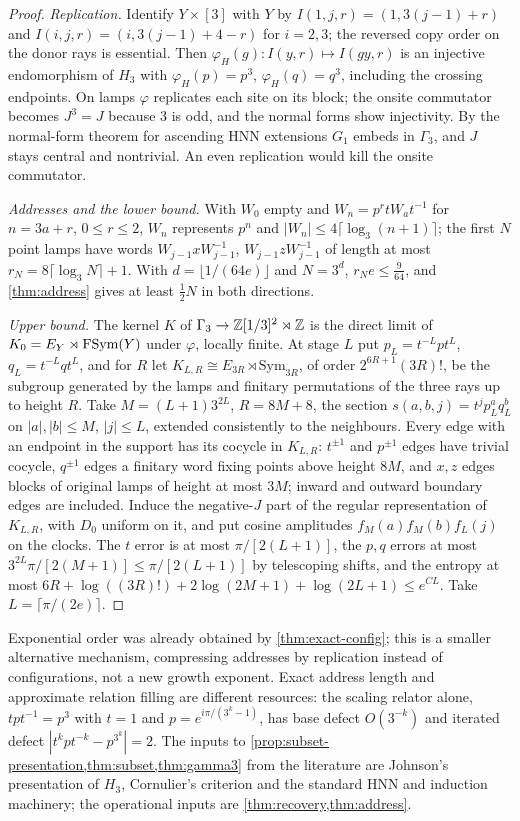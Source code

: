 \begin{proof}
\emph{Replication.} Identify $Y\times[3]$ with $Y$ by $I(1,j,r)=(1,3(j-1)+r)$ and $I(i,j,r)=(i,3(j-1)+4-r)$ for $i=2,3$; the reversed copy
order on the donor rays is essential. Then $\varphi_H(g):I(y,r)\mapsto I(gy,r)$ is an injective endomorphism of $H_3$ with
$\varphi_H(p)=p^3$, $\varphi_H(q)=q^3$, including the crossing endpoints. On lamps $\varphi$ replicates each site on its block; the onsite
commutator becomes $J^3=J$ because $3$ is odd, and the normal forms show injectivity. By the normal-form theorem for ascending HNN
extensions $G_1$ embeds in $\Gamma_3$, and $J$ stays central and nontrivial. An even replication would kill the onsite commutator.

\emph{Addresses and the lower bound.} With $W_0$ empty and $W_n=p^rtW_at^{-1}$ for $n=3a+r$, $0\le r\le2$, $W_n$ represents $p^n$ and
$|W_n|\le4\lceil\log_3(n+1)\rceil$; the first $N$ point lamps have words $W_{j-1}xW_{j-1}^{-1}$, $W_{j-1}zW_{j-1}^{-1}$ of length at most
$r_N=8\lceil\log_3N\rceil+1$. With $d=\lfloor1/(64e)\rfloor$ and $N=3^d$, $r_Ne\le\frac9{64}$, and \cref{thm:address} gives at least $\frac12N$ in both
directions.

\emph{Upper bound.} The kernel $K$ of $\Gamma_3\to\mathbb Z[1/3]^2\rtimes\mathbb Z$ is the direct limit of $K_0=E_Y\rtimes\operatorname{FSym}(Y)$ under $\varphi$, locally finite. At
stage $L$ put $p_L=t^{-L}pt^L$, $q_L=t^{-L}qt^L$, and for $R$ let $K_{L,R}\cong E_{3R}\rtimes\mathrm{Sym}_{3R}$, of order $2^{6R+1}(3R)!$, be the
subgroup generated by the lamps and finitary permutations of the three rays up to height $R$. Take $M=(L+1)3^{2L}$, $R=8M+8$, the
section $s(a,b,j)=t^jp_L^aq_L^b$ on $|a|,|b|\le M$, $|j|\le L$, extended consistently to the neighbours. Every edge with an endpoint in the
support has its cocycle in $K_{L,R}$: $t^{\pm1}$ and $p^{\pm1}$ edges have trivial cocycle, $q^{\pm1}$ edges a finitary word fixing points
above height $8M$, and $x,z$ edges blocks of original lamps of height at most $3M$; inward and outward boundary edges are included.
Induce the negative-$J$ part of the regular representation of $K_{L,R}$, with $D_0$ uniform on it, and put cosine amplitudes
$f_M(a)f_M(b)f_L(j)$ on the clocks. The $t$ error is at most $\pi/[2(L+1)]$, the $p,q$ errors at most $3^{2L}\pi/[2(M+1)]\le\pi/[2(L+1)]$ by
telescoping shifts, and the entropy at most $6R+\log((3R)!)+2\log(2M+1)+\log(2L+1)\le e^{CL}$. Take $L=\lceil\pi/(2e)\rceil$.
\end{proof}

Exponential order was already obtained by \cref{thm:exact-config}; this is a smaller alternative mechanism, compressing addresses by
replication instead of configurations, not a new growth exponent. Exact address length and approximate relation filling are
different resources: the scaling relator alone, $tpt^{-1}=p^3$ with $t=1$ and $p=e^{i\pi/(3^k-1)}$, has base defect $O(3^{-k})$ and
iterated defect $|t^kpt^{-k}-p^{3^k}|=2$. The inputs to \cref{prop:subset-presentation,thm:subset,thm:gamma3} from the literature are
Johnson's presentation of $H_3$, Cornulier's criterion and the standard HNN and induction machinery; the operational inputs are
\cref{thm:recovery,thm:address}.

